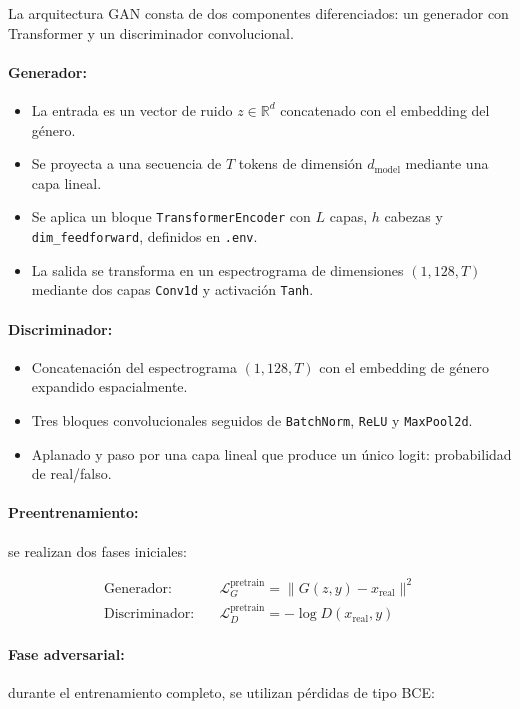 La arquitectura GAN consta de dos componentes diferenciados: un generador con Transformer y un discriminador convolucional.

\paragraph{Generador:}
\begin{itemize}
    \item La entrada es un vector de ruido $z \in \mathbb{R}^{d}$ concatenado con el embedding del género.
    \item Se proyecta a una secuencia de $T$ tokens de dimensión $d_{\text{model}}$ mediante una capa lineal.
    \item Se aplica un bloque \texttt{TransformerEncoder} con $L$ capas, $h$ cabezas y \texttt{dim\_feedforward}, definidos en \texttt{.env}.
    \item La salida se transforma en un espectrograma de dimensiones $(1, 128, T)$ mediante dos capas \texttt{Conv1d} y activación \texttt{Tanh}.
\end{itemize}

\paragraph{Discriminador:}
\begin{itemize}
    \item Concatenación del espectrograma $(1, 128, T)$ con el embedding de género expandido espacialmente.
    \item Tres bloques convolucionales seguidos de \texttt{BatchNorm}, \texttt{ReLU} y \texttt{MaxPool2d}.
    \item Aplanado y paso por una capa lineal que produce un único logit: probabilidad de real/falso.
\end{itemize}

\paragraph{Preentrenamiento:} se realizan dos fases iniciales:

\begin{align*}
\text{Generador:} \quad & \mathcal{L}^{\text{pretrain}}_G = \| G(z, y) - x_{\text{real}} \|^2 \\
\text{Discriminador:} \quad & \mathcal{L}^{\text{pretrain}}_D = -\log D(x_{\text{real}}, y)
\end{align*}

\paragraph{Fase adversarial:} durante el entrenamiento completo, se utilizan pérdidas de tipo BCE:

